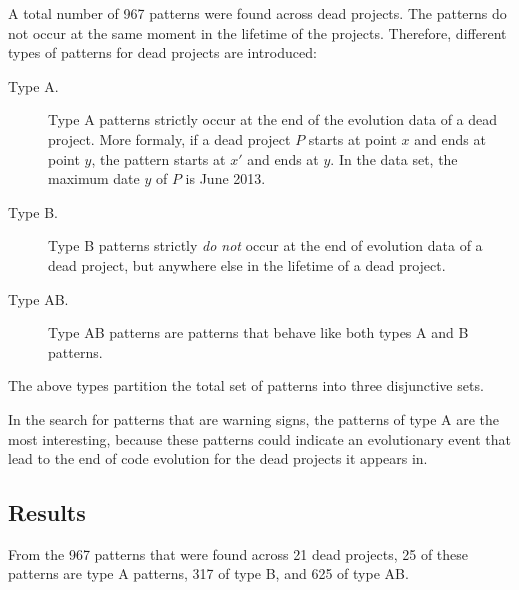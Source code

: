 A total number of 967 patterns were found across dead projects. The patterns
do not occur at the same moment in the lifetime of the projects. Therefore,
different types of patterns for dead projects are introduced:

\begin{description}
	\item[Type A.] Type A patterns strictly occur at the end of the evolution data
		of a dead project. More formaly, if a dead project $P$ starts at point $x$ and
		ends at point $y$, the pattern starts at $x'$ and ends at $y$. In the data
		set, the maximum date $y$ of $P$ is June 2013.
	
	\item[Type B.] Type B patterns strictly \emph{do not }\rm occur at the end of
		evolution data of a dead project, but anywhere else in the lifetime of a dead
		project.
	
	\item[Type AB.] Type AB patterns are patterns that behave like both types A and
		B patterns.
\end{description}

\noindent
The above types partition the total set of patterns into three disjunctive sets.

In the search for patterns that are warning signs, the patterns of type A are
the most interesting, because these patterns could indicate an evolutionary
event that lead to the end of code evolution for the dead projects it appears
in.

\subsection{Results}
From the 967 patterns that were found across 21 dead projects, 25 of these
patterns are type A patterns, 317 of type B, and 625 of type AB.


\begin{comment}
- Execution of the research
- Phases, steps

This chapter reports on the execution of the research method as described in Chapter 3.

If the research has been divided into phases (e.g., using sub questions) the
phases are introduced, reported on and concluded individually. If needed this
Chapter could be split up to balance out the sizes of all Chapters.
An example Research Chapter is provided as Chapter 3 at Paul’s home
page\footnote{http://homepages.cwi.nl/~paulk/thesesMasterSoftwareEngineering/2006/ReneWiegers.pdf}.
\end{comment}
